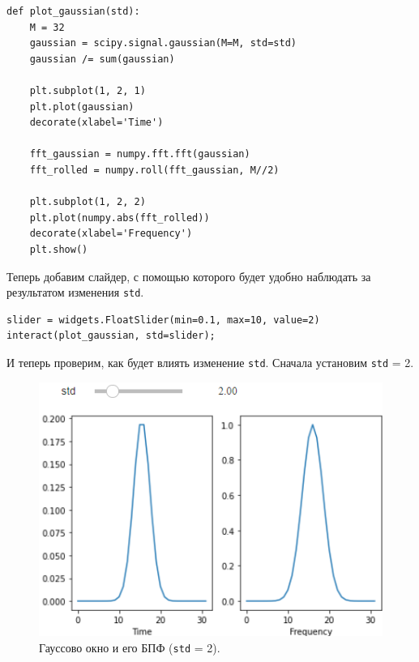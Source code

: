 \documentclass[a4paper, 14pt]{extarticle}
\begin{document}
    \begin{lstlisting}[caption= Функция \texttt{plot\_gaussian}., label={lst:task2_plot_gaussian}]
def plot_gaussian(std):
    M = 32
    gaussian = scipy.signal.gaussian(M=M, std=std)
    gaussian /= sum(gaussian)

    plt.subplot(1, 2, 1)
    plt.plot(gaussian)
    decorate(xlabel='Time')

    fft_gaussian = numpy.fft.fft(gaussian)
    fft_rolled = numpy.roll(fft_gaussian, M//2)

    plt.subplot(1, 2, 2)
    plt.plot(numpy.abs(fft_rolled))
    decorate(xlabel='Frequency')
    plt.show()  \end{lstlisting}

    Теперь добавим слайдер, с помощью которого будет удобно наблюдать за результатом изменения \texttt{std}.

    \begin{lstlisting}[caption= Добавление слайдера., label={lst:task2_slider}]
slider = widgets.FloatSlider(min=0.1, max=10, value=2)
interact(plot_gaussian, std=slider);    \end{lstlisting}

    И теперь проверим, как будет влиять изменение \texttt{std}. Сначала установим \texttt{std} = 2.

    \begin{figure}[H]
        \centering
        \includegraphics[width=0.75\linewidth]{resources/Images/task2_std2}
        \caption{Гауссово окно и его БПФ (\texttt{std} = 2).}
        \label{fig:task2_std2}
    \end{figure}
\end{document}
